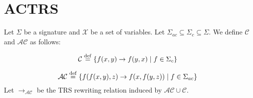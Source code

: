 \documentclass{book}
\begin{document}
\section{ACTRS}







 
\begin{definition}
  \label{def:trs:ac}
  Let $\Sigma$ be a signature and $\mathcal{X}$ be a set of variables.
  Let $\Sigma_{ac} \subseteq \Sigma_{c} \subseteq \Sigma$. We define $\mathcal{C}$ and $\mathcal{AC}$ as follows:
  
  $$\mathcal{C} \overset{\operatorname{def}}{=} \{f(x,y) \to f(y,x) \mid f \in \Sigma_{c} \}$$
  
  $$\mathcal{AC} \overset{\operatorname{def}}{=} 
           \{f(f(x,y),z) \to f(x,f(y,z)) \mid f \in \Sigma_{ac} \}$$
  Let $ \to_\mathcal{AC}$ be the TRS rewriting relation induced by $\mathcal{AC} \cup \mathcal{C}$.
\end{definition}
\end{document}
